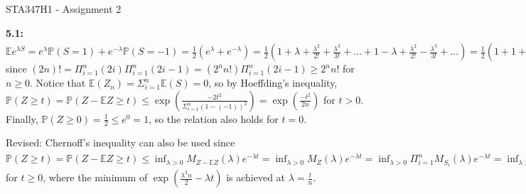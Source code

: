 \documentclass[12pt]{article}
\newcommand{\E}{\mathbb{E}}
\newcommand{\p}{\mathbb{P}}
\begin{document}
\begin{center}
{\Large STA347H1 - Assignment 2}
\end{center}

\textbf{5.1:} $\E e^{\lambda S} = e^{\lambda}\p(S = 1) + e^{-\lambda}\p(S = -1) = \frac{1}{2}(e^{\lambda} + e^{-\lambda}) = \frac{1}{2}(1 + \lambda + \frac{\lambda^2}{2!} + \frac{\lambda^3}{3!} + \ldots + 1 - \lambda + \frac{\lambda^2}{2!} - \frac{\lambda^3}{3!} + \ldots) = \frac{1}{2}(1 + 1 + \frac{\lambda^2}{2!} + \frac{\lambda^2}{2!} + \frac{\lambda^4}{4!} + \frac{\lambda^4}{4!} + \ldots) = \Sigma_{n=0}^\infty \frac{\lambda^{2n}}{(2n)!} \leq \Sigma_{n=0}^\infty \frac{\lambda^{2n}}{2^n n!} = \Sigma_{n=0}^\infty \frac{(\lambda^2/2)^n}{n!} = e^{\lambda^2/2}$ since $(2n)! = \Pi_{i=1}^n (2i) \Pi_{i=1}^n (2i - 1) = (2^n n!)\Pi_{i=1}^n (2i - 1) \geq 2^n n!$ for $n \geq 0$. Notice that $\E(Z_n) = \Sigma_{i=1}^n \E(S) = 0$, so by Hoeffding's inequality, $\p(Z \geq t) = \p(Z - \E Z \geq t) \leq \exp(\frac{-2t^2}{\Sigma_{i=1}^n (1 - (-1))^2}) = \exp(\frac{-t^2}{2n})$ for $t > 0$. Finally, $\p(Z \geq 0) = \frac{1}{2} \leq e^0 = 1$, so the relation also holds for $t = 0$.

Revised: Chernoff's inequality can also be used since $\p(Z \geq t) = \p(Z - \E Z \geq t) \leq \inf_{\lambda > 0} M_{Z - \E Z}(\lambda)e^{-\lambda t} = \inf_{\lambda > 0} M_Z(\lambda)e^{-\lambda t} = \inf_{\lambda > 0} \Pi_{i=1}^n M_{S_i}(\lambda)e^{-\lambda t} = \inf_{\lambda > 0} e^{\lambda^2 n/2} e^{-\lambda t} = \exp(\frac{t^2 n}{2n^2} - \frac{t^2}{n}) = \exp(\frac{-t^2}{2n})$ for $t \geq 0$, where the minimum of $\exp(\frac{\lambda^2 n}{2} - \lambda t)$ is achieved at $\lambda = \frac{t}{n}$.
\end{document}
